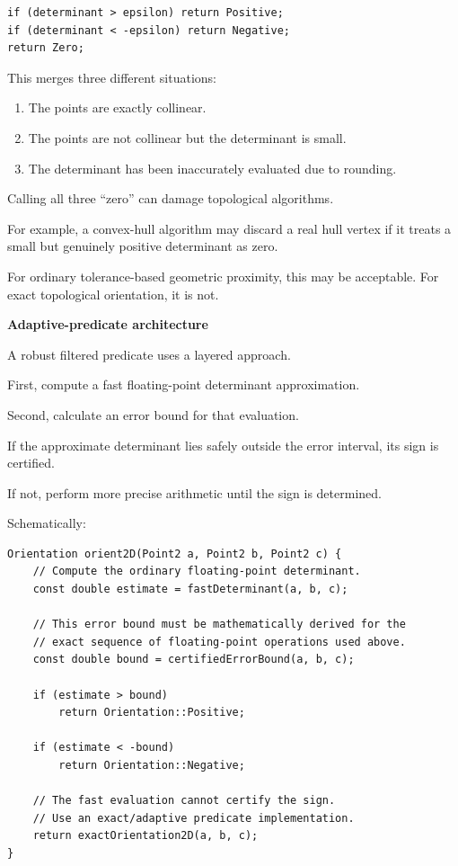 \begin{verbatim}
if (determinant > epsilon) return Positive;
if (determinant < -epsilon) return Negative;
return Zero;
\end{verbatim}

This merges three different situations:

\begin{enumerate}
\def\labelenumi{\arabic{enumi}.}
\tightlist
\item
  The points are exactly collinear.
\item
  The points are not collinear but the determinant is small.
\item
  The determinant has been inaccurately evaluated due to rounding.
\end{enumerate}

Calling all three ``zero'' can damage topological algorithms.

For example, a convex-hull algorithm may discard a real hull vertex if it treats a small but genuinely positive determinant as zero.

For ordinary tolerance-based geometric proximity, this may be acceptable. For exact topological orientation, it is not.

\textbf{Adaptive-predicate architecture}

A robust filtered predicate uses a layered approach.

First, compute a fast floating-point determinant approximation.

Second, calculate an error bound for that evaluation.

If the approximate determinant lies safely outside the error interval, its sign is certified.

If not, perform more precise arithmetic until the sign is determined.

Schematically:

\begin{verbatim}
Orientation orient2D(Point2 a, Point2 b, Point2 c) {
    // Compute the ordinary floating-point determinant.
    const double estimate = fastDeterminant(a, b, c);

    // This error bound must be mathematically derived for the
    // exact sequence of floating-point operations used above.
    const double bound = certifiedErrorBound(a, b, c);

    if (estimate > bound)
        return Orientation::Positive;

    if (estimate < -bound)
        return Orientation::Negative;

    // The fast evaluation cannot certify the sign.
    // Use an exact/adaptive predicate implementation.
    return exactOrientation2D(a, b, c);
}
\end{verbatim}

